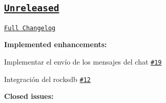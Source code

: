 \subsection*{\href{https://github.com/seguijoaquin/taller2-appserver/tree/HEAD}{\tt Unreleased}}

\href{https://github.com/seguijoaquin/taller2-appserver/compare/v1.0.0...HEAD}{\tt Full Changelog}

{\bfseries Implemented enhancements\+:}


\begin{DoxyItemize}
\item Implementar el envío de los mensajes del chat \href{https://github.com/seguijoaquin/taller2-appserver/issues/19}{\tt \#19}
\item Integración del rocksdb \href{https://github.com/seguijoaquin/taller2-appserver/issues/12}{\tt \#12}
\end{DoxyItemize}

{\bfseries Closed issues\+:}


